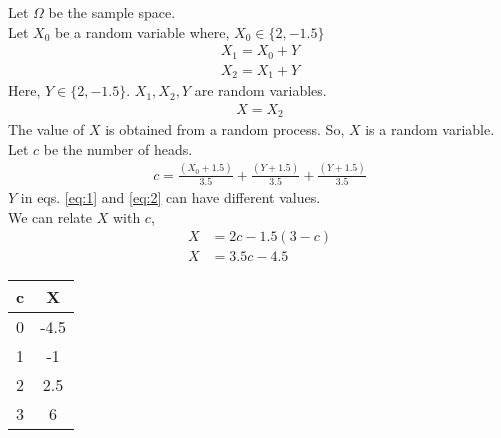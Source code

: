 Let $\Omega$ be the sample space.\\
Let $X_0$ be a random variable where, $X_0 \in \{2, -1.5\}$
\begin{align}
    X_1 = X_0 + Y \label{eq:1}\\
    X_2 = X_1 + Y \label{eq:2}
\end{align}
Here, $Y \in \{2, -1.5\}$. $X_1, X_2, Y$ are random variables.
\begin{align}
    X = X_2
\end{align}
The value of $X$ is obtained from a random process. So, $X$ is a random variable. \\
Let $c$ be the number of heads.
\begin{align}
    c = \frac{(X_0 + 1.5)}{3.5} + \frac{(Y + 1.5)}{3.5} + \frac{(Y + 1.5)}{3.5}
\end{align}
$Y$ in eqs. \eqref{eq:1} and \eqref{eq:2} can have different values. \\
We can relate $X$ with $c$,
\begin{align}
    X &= 2c - 1.5(3 - c) \\
    X &= 3.5c - 4.5
\end{align}
\begin{center}
\begin{tabular}{|c|c|}
\hline
c & X    \\ \hline
0 & -4.5 \\ \hline
1 & -1   \\ \hline
2 & 2.5  \\ \hline
3 & 6  \\ \hline
\end{tabular}
\end{center}